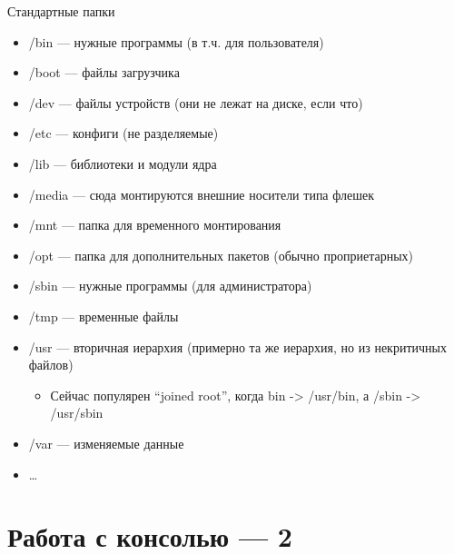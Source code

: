 \documentclass{../../slides-style}
\begin{document}
    \begin{frame}{Стандартные папки}
        \begin{itemize}
            \item /bin --- нужные программы (в т.ч. для пользователя)
            \item /boot --- файлы загрузчика
            \item /dev --- файлы устройств (они не лежат на диске, если что)
            \item /etc --- конфиги (не разделяемые)
            \item /lib --- библиотеки и модули ядра
            \item /media --- сюда монтируются внешние носители типа флешек
            \item /mnt --- папка для временного монтирования
            \item /opt --- папка для дополнительных пакетов (обычно проприетарных)
            \item /sbin --- нужные программы (для администратора)
            \item /tmp --- временные файлы
            \item /usr --- вторичная иерархия (примерно та же иерархия, но из некритичных файлов)
            \begin{itemize}
                \item Сейчас популярен \enquote{joined root}, когда bin -> /usr/bin, а /sbin -> /usr/sbin
            \end{itemize}
            \item /var --- изменяемые данные
            \item \dots
        \end{itemize}
    \end{frame}

    \section{Работа с консолью --- 2}
\end{document}
